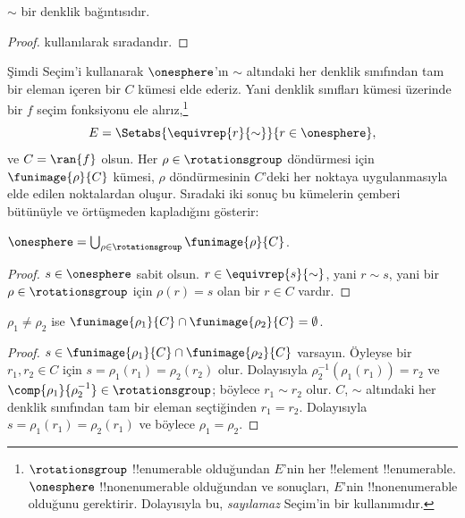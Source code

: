 \begin{lem}
$\sim$ bir denklik bağıntısıdır.
\end{lem}

\begin{proof}
 kullanılarak sıradandır.
\end{proof}

Şimdi Seçim'i kullanarak $\onesphere$'ın $\sim$ altındaki her denklik
sınıfından tam bir eleman içeren bir $C$ kümesi elde ederiz. Yani denklik
sınıfları kümesi üzerinde bir $f$ seçim fonksiyonu ele alırız,\footnote{
$\rotationsgroup$ !!{enumerable} olduğundan $E$'nin her !!{element}
!!{enumerable}. $\onesphere$ !!{nonenumerable} olduğundan
 ve
 sonuçları, $E$'nin
!!{nonenumerable} olduğunu gerektirir. Dolayısıyla bu, \emph{sayılamaz}
Seçim'in bir kullanımıdır.}
\[
	E = \Setabs{\equivrep{r}{\sim}}{r \in \onesphere},
\]
ve $C=\ran{f}$ olsun. Her $\rho\in\rotationsgroup$ döndürmesi için
$\funimage{\rho}{C}$ kümesi, $\rho$ döndürmesinin $C$'deki her noktaya
uygulanmasıyla elde edilen noktalardan oluşur. Sıradaki iki sonuç bu
kümelerin çemberi bütünüyle ve örtüşmeden kapladığını gösterir:

\begin{lem}
$\onesphere = \bigcup_{\rho \in \rotationsgroup} \funimage{\rho}{C}$.
\end{lem}

\begin{proof}
$s\in\onesphere$ sabit olsun. $r\in\equivrep{s}{\sim}$, yani
$r\sim s$, yani bir $\rho\in\rotationsgroup$ için $\rho(r)=s$ olan bir
$r\in C$ vardır.
\end{proof}

\begin{lem}
$\rho_1\neq\rho_2$ ise
$\funimage{\rho_1}{C}\cap\funimage{\rho_2}{C}=\emptyset$.
\end{lem}

\begin{proof}
$s\in\funimage{\rho_1}{C}\cap\funimage{\rho_2}{C}$ varsayın. Öyleyse
bir $r_1,r_2\in C$ için
$s=\rho_1(r_1)=\rho_2(r_2)$ olur. Dolayısıyla
$\rho^{-1}_2(\rho_1(r_1))=r_2$ ve
$\comp{\rho_1}{\rho^{-1}_2}\in\rotationsgroup$; böylece
$r_1\sim r_2$ olur. $C$, $\sim$ altındaki her denklik sınıfından tam bir
eleman seçtiğinden $r_1=r_2$. Dolayısıyla
$s=\rho_1(r_1)=\rho_2(r_1)$ ve böylece $\rho_1=\rho_2$.
\end{proof}

